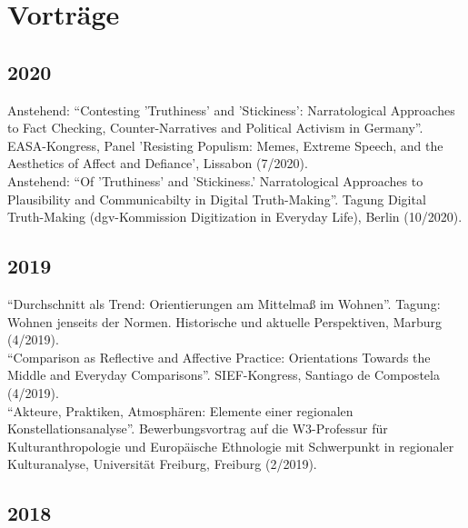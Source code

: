\section*{Vorträge}
\subsection*{2020}
Anstehend: \enquote{Contesting 'Truthiness' and 'Stickiness': Narratological Approaches to Fact Checking, Counter-Narratives and Political Activism in Germany}. EASA-Kongress, Panel 'Resisting Populism: Memes, Extreme Speech, and the Aesthetics of Affect and Defiance', Lissabon (7/2020).\\[.25cm]Anstehend: \enquote{Of 'Truthiness' and 'Stickiness.' Narratological Approaches to Plausibility and Communicabilty in Digital Truth-Making}. Tagung Digital Truth-Making (dgv-Kommission Digitization in Everyday Life), Berlin (10/2020).\subsection*{2019}
\enquote{Durchschnitt als Trend: Orientierungen am Mittelmaß im Wohnen}. Tagung: Wohnen jenseits der Normen. Historische und aktuelle Perspektiven, Marburg (4/2019).\\[.25cm]\enquote{Comparison as Reflective and Affective Practice: Orientations Towards the Middle and Everyday Comparisons}. SIEF-Kongress, Santiago de Compostela (4/2019).\\[.25cm]\enquote{Akteure, Praktiken, Atmosphären: Elemente einer regionalen Konstellationsanalyse}. Bewerbungsvortrag auf die W3-Professur für Kulturanthropologie und Europäische Ethnologie mit Schwerpunkt in regionaler Kulturanalyse, Universität Freiburg, Freiburg (2/2019).\subsection*{2018}
